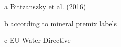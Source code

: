 \begin{table}
\begin{threeparttable}
\begin{tabularx}{\textwidth}{XXXXX}
\bottomrule

    \end{tabularx}
    \begin{tablenotes}
      \item[a] Bittzanszky et al. (2016)
      \item[b] according to mineral premix labels
      \item[c] EU Water Directive
    \end{tablenotes}
  \end{threeparttable}
\end{table}